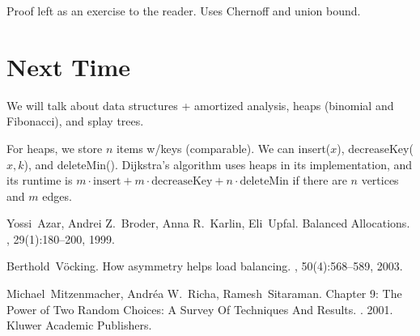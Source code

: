 \documentclass[11pt]{article}
\begin{document}
Proof left as an exercise to the reader. Uses Chernoff and union bound.

\section{Next Time}

We will talk about data structures + amortized analysis, heaps (binomial and Fibonacci), and splay
trees.

For heaps, we store $n$ items w/keys (comparable). We can insert($x$), decreaseKey($x, k$),
and deleteMin(). Dijkstra's algorithm uses heaps in its implementation, and its runtime is
$m \cdot \text{insert} + m \cdot \text{decreaseKey} + n \cdot \text{deleteMin}$ if there are $n$
vertices and $m$ edges.




\begin{thebibliography}{42}

Yossi~Azar, Andrei Z.~Broder, Anna R.~Karlin, Eli~Upfal.
\newblock Balanced Allocations.
, 29(1):180--200, 1999.

Berthold~V\"ocking.
\newblock How asymmetry helps load balancing.
, 50(4):568--589, 2003.

Michael~Mitzenmacher, Andr\'{e}a W.~Richa, Ramesh~Sitaraman.
\newblock Chapter 9: The Power of Two Random Choices:
A Survey Of Techniques And Results.
. 2001. Kluwer Academic Publishers.
\newblock

\end{thebibliography}
\end{document}

